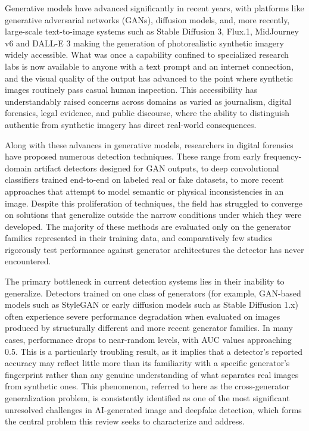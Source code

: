 \documentclass[sn-mathphys-num,Numbered,pdflatex]{sn-jnl}
\begin{document}
Generative models have advanced significantly in recent years, with platforms like generative adversarial networks (GANs), diffusion models, and, more recently, large-scale text-to-image systems such as Stable Diffusion 3, Flux.1, MidJourney v6 and DALL-E 3 making the generation of photorealistic synthetic imagery widely accessible. What was once a capability confined to specialized research labs is now available to anyone with a text prompt and an internet connection, and the visual quality of the output has advanced to the point where synthetic images routinely pass casual human inspection. This accessibility has understandably raised concerns across domains as varied as journalism, digital forensics, legal evidence, and public discourse, where the ability to distinguish authentic from synthetic imagery has direct real-world consequences.

Along with these advances in generative models, researchers in digital forensics have proposed numerous detection techniques. These range from early frequency-domain artifact detectors designed for GAN outputs, to deep convolutional classifiers trained end-to-end on labeled real or fake datasets, to more recent approaches that attempt to model semantic or physical inconsistencies in an image. Despite this proliferation of techniques, the field has struggled to converge on solutions that generalize outside the narrow conditions under which they were developed. The majority of these methods are evaluated only on the generator families represented in their training data, and comparatively few studies rigorously test performance against generator architectures the detector has never encountered.

The primary bottleneck in current detection systems lies in their inability to generalize. Detectors trained on one class of generators (for example, GAN-based models such as StyleGAN or early diffusion models such as Stable Diffusion 1.x) often experience severe performance degradation when evaluated on images produced by structurally different and more recent generator families. In many cases, performance drops to near-random levels, with AUC values approaching 0.5. This is a particularly troubling result, as it implies that a detector's reported accuracy may reflect little more than its familiarity with a specific generator's fingerprint rather than any genuine understanding of what separates real images from synthetic ones. This phenomenon, referred to here as the cross-generator generalization problem, is consistently identified as one of the most significant unresolved challenges in AI-generated image and deepfake detection, which forms the central problem this review seeks to characterize and address.
\end{document}

